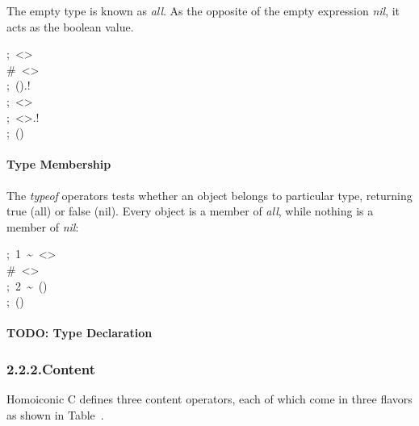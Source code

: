 \documentclass[preprint]{{sigplanconf}}
\begin{document}
\noindent{}The empty type \mdcode{\textless{}\textgreater{}} is known as \emph{all}. As the opposite of the empty expression \mdcode{()} \emph{nil},
it acts as the boolean  value.%
\begin{mdpre}%
\noindent;~\textless{}\textgreater{}\\
{\#~\textless{}\textgreater{}}\\
;~().!\\
;~\textless{}\textgreater{}\\
;~\textless{}\textgreater{}.!\\
;~()%
\end{mdpre}
\paragraph{Type Membership}\label{sec-type-membership}%

\noindent{}The \emph{typeof} operators \mdcode{\textasciitilde{}} tests whether an object belongs to particular
type, returning true (all) or false (nil). Every object is a member of
\emph{all}, while nothing is a member of \emph{nil}:%
\begin{mdpre}%
\noindent;~1~\textasciitilde{}~\textless{}\textgreater{}\\
{\#~\textless{}\textgreater{}}\\
;~2~\textasciitilde{}~()\\
;~()%
\end{mdpre}
\paragraph{TODO: Type Declaration}\label{sec-todo--type-declaration}%

\subsubsection{2.2.2.\hspace*{0.5em}Content}\label{sec-content}%

\noindent{}Homoiconic C defines three content operators, each of which come in three
flavors as shown in Table~.%
\end{document}
